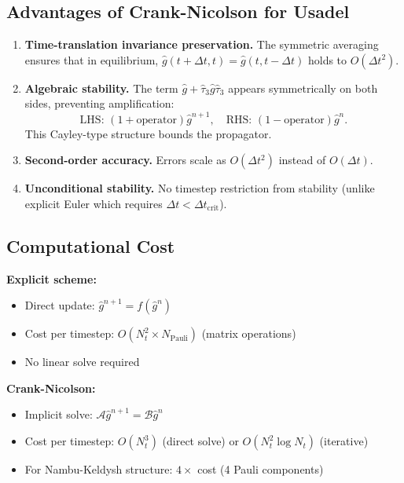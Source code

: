 \documentclass[11pt]{article}
\begin{document}
\subsection{Advantages of Crank-Nicolson for Usadel}

\begin{enumerate}
\item \textbf{Time-translation invariance preservation.} The symmetric averaging ensures that in equilibrium, $\hat{g}(t+\Delta t, t) = \hat{g}(t, t-\Delta t)$ holds to $O(\Delta t^2)$.

\item \textbf{Algebraic stability.} The term $\hat{g} + \hat{\tau}_3 \hat{g} \hat{\tau}_3$ appears symmetrically on both sides, preventing amplification:
\begin{equation}
\text{LHS: } (1 + \text{operator}) \hat{g}^{n+1}, \quad \text{RHS: } (1 - \text{operator}) \hat{g}^n.
\end{equation}
This Cayley-type structure bounds the propagator.

\item \textbf{Second-order accuracy.} Errors scale as $O(\Delta t^2)$ instead of $O(\Delta t)$.

\item \textbf{Unconditional stability.} No timestep restriction from stability (unlike explicit Euler which requires $\Delta t < \Delta t_{\text{crit}}$).
\end{enumerate}

\subsection{Computational Cost}

\textbf{Explicit scheme:}
\begin{itemize}
\item Direct update: $\hat{g}^{n+1} = f(\hat{g}^n)$
\item Cost per timestep: $O(N_t^2 \times N_{\text{Pauli}})$ (matrix operations)
\item No linear solve required
\end{itemize}

\textbf{Crank-Nicolson:}
\begin{itemize}
\item Implicit solve: $\mathcal{A} \hat{g}^{n+1} = \mathcal{B} \hat{g}^n$
\item Cost per timestep: $O(N_t^3)$ (direct solve) or $O(N_t^2 \log N_t)$ (iterative)
\item For Nambu-Keldysh structure: $4 \times$ cost (4 Pauli components)
\end{itemize}
\end{document}
